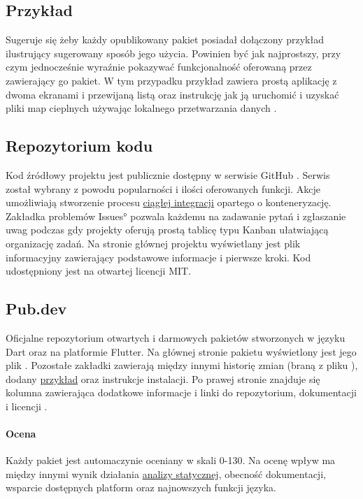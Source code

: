 
\subsection{Przykład}
\label{sec:rs_example}
Sugeruje się żeby każdy opublikowany pakiet posiadał dołączony przykład ilustrujący sugerowany sposób jego użycia. Powinien być jak najprostszy, przy czym jednocześnie wyraźnie pokazywać funkcjonalność oferowaną przez zawierający go pakiet. W tym przypadku przykład zawiera prostą aplikację z dwoma ekranami i przewijaną listą oraz instrukcję jak ją uruchomić i uzyskać pliki map cieplnych używając lokalnego przetwarzania danych \cite{RS_Example}.

\subsection{Repozytorium kodu}
Kod źródłowy projektu jest publicznie dostępny w serwisie GitHub \cite{RoundSpot_GitHub}. Serwis został wybrany z powodu popularności i ilości oferowanych funkcji. Akcje umożliwiają stworzenie procesu \hyperref[sec:rs_ci]{ciągłej integracji} opartego o konteneryzację. Zakładka problemów \ang{Issues} pozwala każdemu na zadawanie pytań i zgłaszanie uwag podczas gdy projekty oferują prostą tablicę typu Kanban ułatwiającą organizację zadań. Na stronie głównej projektu wyświetlany jest plik informacyjny  zawierający podstawowe informacje i pierwsze kroki. Kod udostępniony jest na otwartej licencji MIT.

\subsection{Pub.dev}
Oficjalne repozytorium otwartych i darmowych pakietów stworzonych w języku Dart oraz na platformie Flutter. Na głównej stronie pakietu wyświetlony jest jego plik . Pozostałe zakładki zawierają między innymi historię zmian (braną z pliku ), dodany \hyperref[sec:rs_example]{przykład} oraz instrukcje instalacji. Po prawej stronie znajduje się kolumna zawierająca dodatkowe informacje i linki do repozytorium, dokumentacji i licencji \cite{RS_Pub_dev}.

\paragraph{Ocena} Każdy pakiet jest automaczynie oceniany w skali 0-130. Na ocenę wpływ ma między innymi wynik działania \hyperref[par:static_analysis]{analizy statycznej}, obecność dokumentacji, wsparcie dostępnych platform oraz najnowszych funkcji języka.



